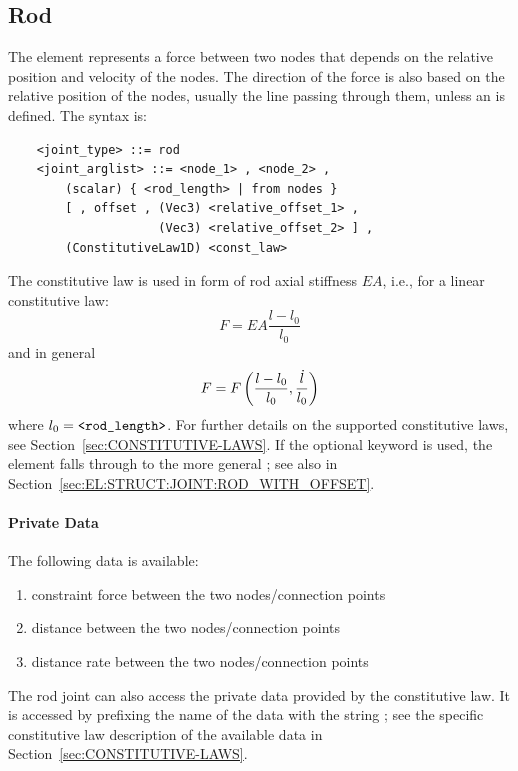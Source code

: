 \subsection{Rod}\label{sec:EL:STRUCT:JOINT:ROD}
The  element represents a force between two nodes that depends
on the relative position and velocity of the nodes.
The direction of the force is also based on the relative position
of the nodes, usually the line passing through them, unless 
an  is defined.
The syntax is:
\begin{verbatim}
    <joint_type> ::= rod 
    <joint_arglist> ::= <node_1> , <node_2> , 
        (scalar) { <rod_length> | from nodes }
        [ , offset , (Vec3) <relative_offset_1> , 
                     (Vec3) <relative_offset_2> ] ,
        (ConstitutiveLaw1D) <const_law>
\end{verbatim}
The constitutive law  is used in form 
of rod axial stiffness $EA$, i.e., for a linear constitutive law:
\begin{displaymath}
	F = EA \frac{l - l_0}{l_0}
\end{displaymath}
and in general
\begin{displaymath}
	F = F\left( \frac{l - l_0}{l_0}, \frac{\dot{l}}{l_0} \right)
\end{displaymath}
where $l_0=\texttt{<rod\_length>}$.
For further details on the supported constitutive laws, 
see Section~\ref{sec:CONSTITUTIVE-LAWS}.
If the optional  keyword is used, the element falls through
to the more general ;
see also 
in Section~\ref{sec:EL:STRUCT:JOINT:ROD_WITH_OFFSET}.

\paragraph{Private Data}
The following data is available:
\begin{enumerate}
\item {} constraint force between the two nodes/connection points
\item {} distance between the two nodes/connection points
\item {} distance rate between the two nodes/connection points
\end{enumerate}
The rod joint can also access the private data provided 
by the constitutive law.
It is accessed by prefixing the name of the data with the string
; see the specific constitutive law
description of the available data in Section~\ref{sec:CONSTITUTIVE-LAWS}.





